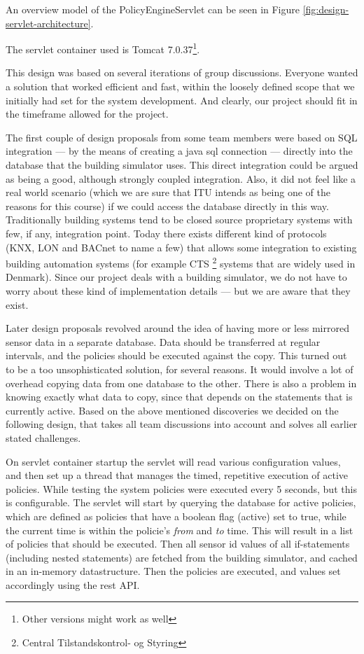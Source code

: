 An overview model of the PolicyEngineServlet can be seen in Figure \ref{fig:design-servlet-architecture}.

The servlet container used is Tomcat 7.0.37\footnote{Other versions might work as well}. 

This design was based on several iterations of group discussions. Everyone wanted a solution that worked efficient and fast, within the loosely defined scope that we initially had set for the system development. And clearly, our project should fit in the timeframe allowed for the project.

The first couple of design proposals from some team members were based on SQL integration --- by the means of creating a java sql connection --- directly into the database that the building simulator uses. This direct integration could be argued as being a good, although strongly coupled integration. Also, it did not feel like a real world scenario (which we are sure that ITU intends as being one of the reasons for this course) if we could access the database directly in this way. Traditionally building systems tend to be closed source proprietary systems with few, if any, integration point. Today there exists different kind of protocols (KNX, LON and BACnet to name a few) that allows some integration to existing building automation systems (for example CTS \footnote{Central Tilstandskontrol- og Styring} systems that are widely used in Denmark). Since our project deals with a building simulator, we do not have to worry about these kind of implementation details --- but we are aware that they exist.

Later design proposals revolved around the idea of having more or less mirrored sensor data in a separate database. Data should be transferred at regular intervals, and the policies should be executed against the copy. This turned out to be a too unsophisticated solution, for several reasons. It would involve a lot of overhead copying data from one database to the other. There is also a problem in knowing exactly what data to copy, since that depends on the statements that is currently active. Based on the above mentioned discoveries we decided on the  following design, that takes all team discussions into account and solves all earlier stated challenges.

On servlet container startup the servlet will read various configuration values, and then set up a thread that manages the timed, repetitive execution of active policies. While testing the system policies were executed every 5 seconds, but this is configurable. The servlet will start by querying the database for active policies, which are defined as policies that have a boolean flag (active) set to true, while the current time is within the policie's \textit{from} and \textit{to} time. This will result in a list of policies that should be executed. Then all sensor id values of all if-statements (including nested statements) are fetched from the building simulator, and cached in an in-memory datastructure. Then the policies are executed, and values set accordingly using the rest API.

